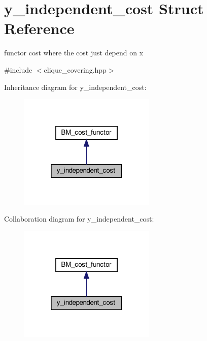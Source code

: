 \hypertarget{structy__independent__cost}{}\section{y\+\_\+independent\+\_\+cost Struct Reference}
\label{structy__independent__cost}


functor cost where the cost just depend on x  




{\ttfamily \#include $<$clique\+\_\+covering.\+hpp$>$}



Inheritance diagram for y\+\_\+independent\+\_\+cost\+:
\nopagebreak
\begin{figure}[H]
\begin{center}
\leavevmode
\includegraphics[width=184pt]{df/d67/structy__independent__cost__inherit__graph}
\end{center}
\end{figure}


Collaboration diagram for y\+\_\+independent\+\_\+cost\+:
\nopagebreak
\begin{figure}[H]
\begin{center}
\leavevmode
\includegraphics[width=184pt]{d3/db8/structy__independent__cost__coll__graph}
\end{center}
\end{figure}
